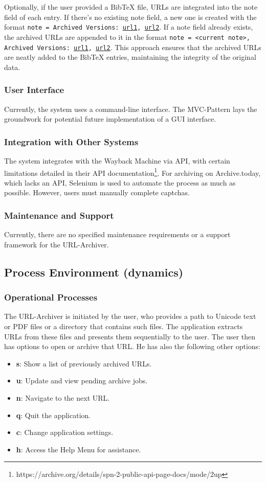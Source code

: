Optionally, if the user provided a BibTeX file, URLs are integrated into the note field of each entry. If there's no existing note field, a new one is created with the format \texttt{note = {Archived Versions: \url{url1}, \url{url2}}}. If a note field already exists, the archived URLs are appended to it in the format \texttt{note = {<current note>, Archived Versions: \url{url1}, \url{url2}}}. This approach ensures that the archived URLs are neatly added to the BibTeX entries, maintaining the integrity of the original data.

\subsubsection{User Interface}
Currently, the system uses a command-line interface. The MVC-Pattern  lays the groundwork for potential future implementation of a GUI interface.

\subsubsection{Integration with Other Systems}
The system integrates with the Wayback Machine via API, with certain limitations detailed in their API documentation\footnote{https://archive.org/details/spn-2-public-api-page-docs/mode/2up}. For archiving on Archive.today, which lacks an API, Selenium  is used to automate the process as much as possible. However, users must manually complete captchas.

\subsubsection{Maintenance and Support}
Currently, there are no specified maintenance requirements or a support framework for the URL-Archiver.
\clearpage

\subsection{Process Environment (dynamics)}
\subsubsection{Operational Processes}
The URL-Archiver is initiated by the user, who provides a path to Unicode text or PDF files or a directory that contains such files. The application extracts URLs from these files and presents them sequentially to the user. The user then has options to open or archive that URL. He has also the following other options: 
\begin{itemize}
	\item \textbf{s}: Show a list of previously archived URLs.
	\item \textbf{u}: Update and view pending archive jobs.
	\item \textbf{n}: Navigate to the next URL.
	\item \textbf{q}: Quit the application.
	\item \textbf{c}: Change application settings.
	\item \textbf{h}: Access the Help Menu for assistance.
\end{itemize}

